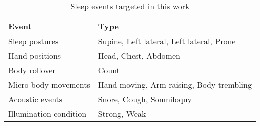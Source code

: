 \begin{table}[t!]
 \caption{\label{tab:test}Sleep events targeted in this work}
 \centering
 \begin{tabular}{ll}
  \toprule
  \textbf{Event}& \textbf{Type} \\
  \midrule
\rowcolor{Gray}  Sleep postures & Supine, Left lateral, Left lateral, Prone\\
 Hand positions & Head, Chest, Abdomen\\
\rowcolor{Gray} Body rollover & Count\\
 Micro body movements& Hand moving, Arm raising, Body trembling \\
\rowcolor{Gray} Acoustic events & Snore, Cough, Somniloquy  \\
 Illumination condition & Strong, Weak  \\
  \bottomrule
 \end{tabular}
\end{table}

